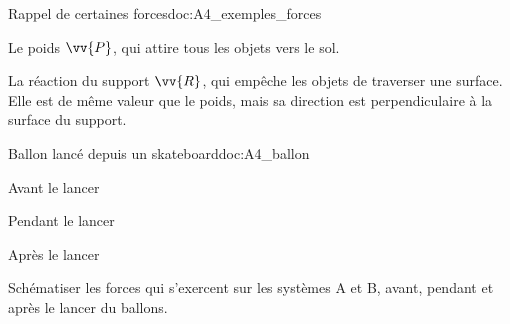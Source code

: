 \begin{doc}{Rappel de certaines forces}{doc:A4_exemples_forces}
  \begin{listePoints}
    \item Le poids $\vv{P}$, qui attire tous les objets vers le sol.
    \item La réaction du support $\vv{R}$, qui empêche les objets de traverser une surface. Elle est de même valeur que le poids, mais sa direction est perpendiculaire à la surface du support. 
  \end{listePoints}
\end{doc}


\begin{doc}{Ballon lancé depuis un skateboard}{doc:A4_ballon}
  \begin{flushright}
    \vspace*{-18pt}
  \end{flushright}
  \begin{multicols}{3}
    \centering
    
    Avant le lancer
    

    Pendant le lancer
    

    Après le lancer
  \end{multicols}
\end{doc}





\numeroQuestion Schématiser les forces qui s'exercent sur les systèmes A et B, avant, pendant et après le lancer du ballons. 


